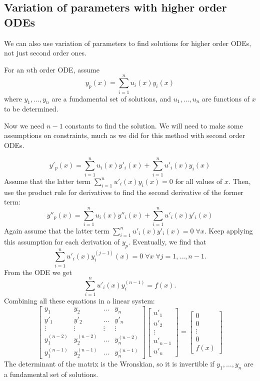 \documentclass[11pt]{article}
\begin{document}
\subsection{Variation of parameters with higher order ODEs}
	We can also use variation of parameters to find solutions for higher order ODEs, not just second order ones.

	For an $n$th order ODE, assume
		$$ y_p (x) = \sum_{i=1}^n u_i (x) y_i (x) $$
	where $y_1, \ldots, y_n$ are a fundamental set of solutions, and $u_1, \ldots, u_n$ are functions of $x$ to be determined.

	Now we need $n-1$ constants to find the solution. We will need to make some assumptions on constraints, much as we did for this method with second order ODEs.

		$$ y'_p (x) = \sum_{i=1}^n u_i (x) y'_i (x) + \sum_{i=1}^n u'_i (x) y_i(x) $$
	Assume that the latter term $\sum_{i=1}^n u'_i (x) y_i(x) = 0$ for all values of $x$. Then, use the product rule for derivatives to find the second derivative of the former term:
		$$ y''_p (x) = \sum_{i=1}^n u_i (x) y''_i (x) + \sum_{i=1}^n u'_i (x) y'_i (x) $$
	Again assume that the latter term $\sum_{i=1}^n u'_i (x) y'_i (x) = 0 \; \forall x$. Keep applying this assumption for each derivation of $y_p$. Eventually, we find that
		$$ \sum_{i=1}^n u'_i (x) y^{(j-1)}_i (x) = 0 \; \forall x \; \forall j = 1, \ldots, n-1. $$
	From the ODE we get
		$$ \sum_{i=1}^n u'_i (x) y_i^{(n-1)} = f(x). $$
	Combining all these equations in a linear system:
		\[
			\left[
			\begin{array}{cccc}
				y_1 & y_2 & \ldots & y_n \\
				y'_1 & y'_2 & \ldots & y'_n \\
				\vdots & \vdots & \vdots & \vdots \\
				y_1^{(n-2)} & y_2^{(n-2)} & \ldots & y_n^{(n-2)} \\
				y_1^{(n-1)} & y_2^{(n-1)} & \ldots & y_n^{(n-1)}
			\end{array}
			\right]
			\left[
			\begin{array}{c}
				u'_1 \\
				u'_2 \\
				\vdots \\
				u'_{n-1} \\
				u'_n
			\end{array}
			\right]
			=
			\left[
			\begin{array}{c}
				0 \\
				0 \\
				\vdots \\
				0 \\
				f(x)
			\end{array}
			\right]
		\]
	The determinant of the matrix is the Wronskian, so it is invertible if $y_1, \ldots, y_n$ are a fundamental set of solutions.
\end{document}
